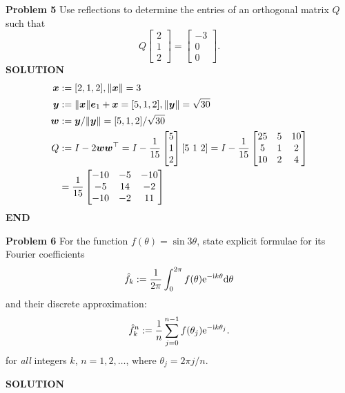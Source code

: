 \documentclass[12pt,a4paper]{article}
\def\x{ {\vc x} }
\def\e{ {\vc e} }
\def\y{ {\vc y} }
\def\w{ {\vc w} }
\begin{document}
\textbf{Problem 5} Use reflections to determine the entries of an orthogonal matrix $Q$ such that
\[
Q \begin{bmatrix} 2 \\ 1 \\ 2 \end{bmatrix} =  \begin{bmatrix} -3 \\ 0 \\ 0 \end{bmatrix}.
\]
\textbf{SOLUTION}
\begin{align*}
\ensuremath{\bm{\x}} &:= [2,1,2], \| \ensuremath{\bm{\x}} \| = 3\\
\ensuremath{\bm{\y}} &:= \|\ensuremath{\bm{\x}}\| \ensuremath{\bm{\e}}_1 + \ensuremath{\bm{\x}} = [5,1,2], \| \ensuremath{\bm{\y}} \| = \sqrt{30} \\
\ensuremath{\bm{\w}} &:= \ensuremath{\bm{\y}} / \| \ensuremath{\bm{\y}} \| = [5,1,2] /  \sqrt{30} \\
Q &:= I - 2\ensuremath{\bm{\w}} \ensuremath{\bm{\w}}^\ensuremath{\top} = I - {1 \over 15} \begin{bmatrix}5 \\ 1 \\ 2 \end{bmatrix} [5\ 1\ 2] = I - {1 \over 15} \begin{bmatrix} 25 & 5 & 10 \\5 & 1 & 2 \\ 10 & 2 & 4 \end{bmatrix} \\
&= {1 \over 15} \begin{bmatrix} -10 & -5 & -10 \\ -5 & 14 & -2 \\ -10 & -2 & 11 \end{bmatrix}
\end{align*}
\textbf{END}

\textbf{Problem 6} For the function $f(\ensuremath{\theta}) = \sin 3 \ensuremath{\theta}$, state explicit formulae for its Fourier coefficients
\[
\hat f_k := {1 \over 2\ensuremath{\pi}} \int_0^{2\ensuremath{\pi}} f(\ensuremath{\theta}) {\rm e}^{-{\rm i} k \ensuremath{\theta}} {\rm d}\ensuremath{\theta}
\]
and  their discrete approximation:
\[
\hat f_k^n := {1 \over n} \sum_{j=0}^{n-1} f(\ensuremath{\theta}_j) {\rm e}^{-{\rm i} k \ensuremath{\theta}_j}.
\]
for \emph{all} integers $k$, $n = 1,2,\ensuremath{\ldots}$, where $\ensuremath{\theta}_j = 2\ensuremath{\pi} j/n$.

\textbf{SOLUTION}
\end{document}
